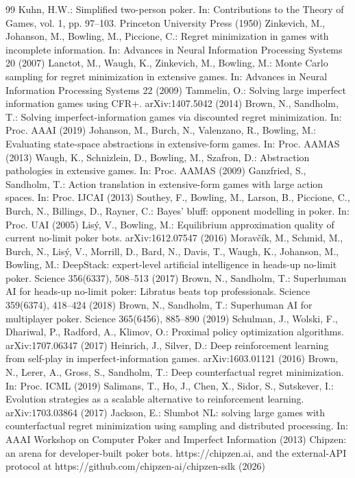 \documentclass[runningheads]{llncs}
\begin{document}
\begin{thebibliography}{99}
 Kuhn, H.W.: Simplified two-person poker. In: Contributions to the Theory of Games, vol. 1, pp. 97–103. Princeton University Press (1950)
 Zinkevich, M., Johanson, M., Bowling, M., Piccione, C.: Regret minimization in games with incomplete information. In: Advances in Neural Information Processing Systems 20 (2007)
 Lanctot, M., Waugh, K., Zinkevich, M., Bowling, M.: Monte Carlo sampling for regret minimization in extensive games. In: Advances in Neural Information Processing Systems 22 (2009)
 Tammelin, O.: Solving large imperfect information games using CFR+. arXiv:1407.5042 (2014)
 Brown, N., Sandholm, T.: Solving imperfect-information games via discounted regret minimization. In: Proc. AAAI (2019)
 Johanson, M., Burch, N., Valenzano, R., Bowling, M.: Evaluating state-space abstractions in extensive-form games. In: Proc. AAMAS (2013)
 Waugh, K., Schnizlein, D., Bowling, M., Szafron, D.: Abstraction pathologies in extensive games. In: Proc. AAMAS (2009)
 Ganzfried, S., Sandholm, T.: Action translation in extensive-form games with large action spaces. In: Proc. IJCAI (2013)
 Southey, F., Bowling, M., Larson, B., Piccione, C., Burch, N., Billings, D., Rayner, C.: Bayes' bluff: opponent modelling in poker. In: Proc. UAI (2005)
 Lisý, V., Bowling, M.: Equilibrium approximation quality of current no-limit poker bots. arXiv:1612.07547 (2016)
 Moravčík, M., Schmid, M., Burch, N., Lisý, V., Morrill, D., Bard, N., Davis, T., Waugh, K., Johanson, M., Bowling, M.: DeepStack: expert-level artificial intelligence in heads-up no-limit poker. Science 356(6337), 508–513 (2017)
 Brown, N., Sandholm, T.: Superhuman AI for heads-up no-limit poker: Libratus beats top professionals. Science 359(6374), 418–424 (2018)
 Brown, N., Sandholm, T.: Superhuman AI for multiplayer poker. Science 365(6456), 885–890 (2019)
 Schulman, J., Wolski, F., Dhariwal, P., Radford, A., Klimov, O.: Proximal policy optimization algorithms. arXiv:1707.06347 (2017)
 Heinrich, J., Silver, D.: Deep reinforcement learning from self-play in imperfect-information games. arXiv:1603.01121 (2016)
 Brown, N., Lerer, A., Gross, S., Sandholm, T.: Deep counterfactual regret minimization. In: Proc. ICML (2019)
 Salimans, T., Ho, J., Chen, X., Sidor, S., Sutskever, I.: Evolution strategies as a scalable alternative to reinforcement learning. arXiv:1703.03864 (2017)
 Jackson, E.: Slumbot NL: solving large games with counterfactual regret minimization using sampling and distributed processing. In: AAAI Workshop on Computer Poker and Imperfect Information (2013)
 Chipzen: an arena for developer-built poker bots. https://chipzen.ai, and the external-API protocol at https://github.com/chipzen-ai/chipzen-sdk (2026)
\end{thebibliography}
\end{document}
